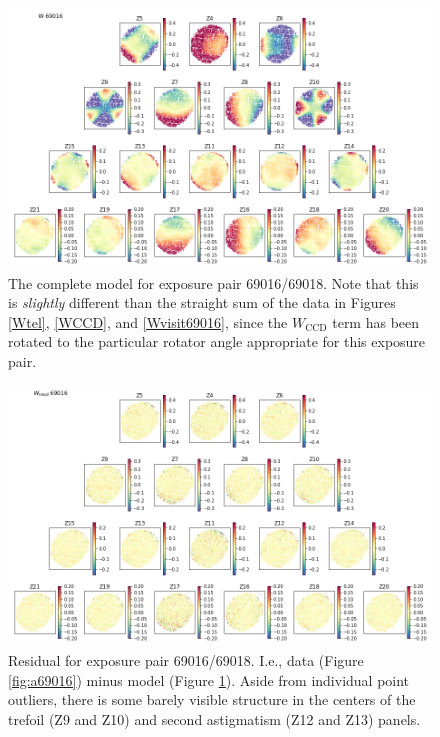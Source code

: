 \documentclass{article}
\begin{document}
\begin{figure}
    \includegraphics[width=\textwidth]{W69016.png}

    \caption{The complete model for exposure pair 69016/69018.  Note that this
    is \emph{slightly} different than the straight sum of the data in Figures
    \ref{Wtel}, \ref{WCCD}, and \ref{Wvisit69016}, since the $W_\mathrm{CCD}$
    term has been rotated to the particular rotator angle appropriate for this
    exposure pair.}

    \label{fig:W69016}
\end{figure}

\begin{figure}
    \includegraphics[width=\textwidth]{Wresid69016.png}

    \caption{Residual for exposure pair 69016/69018.  I.e., data (Figure
    \ref{fig:a69016}) minus model (Figure \ref{fig:W69016}).  Aside from
    individual point outliers, there is some barely visible structure in the
    centers of the trefoil (Z9 and Z10) and second astigmatism (Z12 and Z13)
    panels.}

    \label{fig:Wresid69016}
\end{figure}
\end{document}

